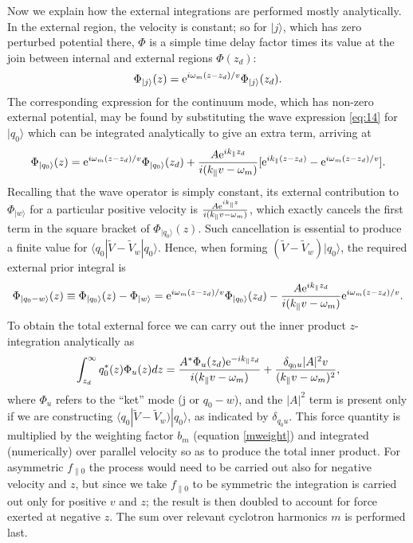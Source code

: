 \documentclass[12pt]{article}
\def\ket#1{|#1\rangle}
\def\bra#1{\langle#1}
\def\etothe#1{{\rm e}^{#1}}
\begin{document}
Now we explain how the external integrations are performed mostly
analytically.  In the external region, the velocity is constant; so
for $\ket{j}$, which has zero perturbed potential there, $\Phi$ is a
simple time delay factor times its value at the join between internal
and external regions $\Phi(z_d)$:
\begin{equation}
  \label{phi4}
  \Phi_{\ket{j}}(z)=\etothe{i\omega_m(z-z_d)/v}   \Phi_{\ket{j}}(z_d).
\end{equation}
The corresponding expression for the continuum mode, which has
non-zero external potential, may be
found by substituting the wave expression \ref{eq:14} for  $\ket{q_0}$
which can be integrated analytically to give an extra term, arriving
at 
\begin{equation}
  \label{phiq}
  \Phi_{\ket{q_0}}(z)=\etothe{i\omega_m(z-z_d)/v}   \Phi_{\ket{q_0}}(z_d)
  +{A\etothe{ik_\parallel z_d}\over i(k_\parallel v-\omega_m)}[\etothe{ik_\parallel(z-z_d)}
  -\etothe{i\omega_m(z-z_d)/v}].
\end{equation}
Recalling that the wave operator is simply constant, its external
contribution to $\Phi_{\ket{w}}$ for a particular positive velocity is
${A\etothe{ik_\parallel z}\over i(k_\parallel v-\omega_m)}$, which
exactly cancels the first term in the square bracket of
$\Phi_{\ket{q_0}}(z)$. Such cancellation is essential to produce a
finite value for $\bra{q_0}|\tilde V -\tilde V_w\ket{q_0}$. Hence,
when forming
$(\tilde V -\tilde V_w)\ket{q_0}$, the required external prior
integral is
\begin{equation}
  \label{phidiff}
  \Phi_{\ket{q_0-w}}(z)\equiv \Phi_{\ket{q_0}}(z)-\Phi_{\ket{w}}
  =\etothe{i\omega_m(z-z_d)/v}   \Phi_{\ket{q_0}}(z_d)
  -{A\etothe{ik_\parallel z_d}\over i(k_\parallel v-\omega_m)}
  \etothe{i\omega_m(z-z_d)/v}.
\end{equation}
To obtain the total external force we can carry out the inner product
$z$-integration analytically as
\begin{equation}
  \label{extforce}
  \int_{z_d}^\infty q_0^*(z) \Phi_u(z)  dz =
  {A^*\Phi_u(z_d)\etothe{-ik_\parallel z_d}\over i(k_\parallel  v-\omega_m)}
  + {\delta_{q_0u}|A|^2v\over (k_\parallel v-\omega_m)^2},
\end{equation}
where $\Phi_u$ refers to the ``ket'' mode (j or $q_0-w$), and the
$|A|^2$ term is present only if we are constructing
$\bra{q_0}|\tilde V -\tilde V_w)\ket{q_0}$, as indicated by
$\delta_{q_0u}$. This force quantity is multiplied by the
weighting factor $b_m$ (equation \ref{mweight}) and integrated
(numerically) over parallel velocity so as to produce the total inner
product. For asymmetric $f_{\parallel0}$ the process would need to be
carried out also for negative velocity and $z$, but since we take
$f_{\parallel0}$ to be symmetric the integration is carried out only
for positive $v$ and $z$; the result is then doubled to account for
force exerted at negative $z$. The sum over relevant cyclotron
harmonics $m$ is performed last.
\end{document}

